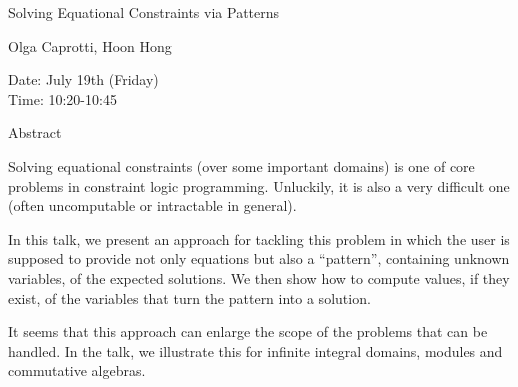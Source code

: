 \begin{center}
\LARGE
Solving Equational Constraints via Patterns

\end{center}

\begin{center}
\Large
Olga Caprotti, Hoon Hong

\end{center}

\noindent
Date:  July 19th (Friday)\\
Time:  10:20-10:45\\

\begin{center}
\large
Abstract
\end{center}

Solving equational constraints (over some important domains) is one of core problems in
constraint logic programming. Unluckily, it is also a very difficult one (often uncomputable or
intractable in general). 

In this talk, we present an approach for tackling this problem in which the user is supposed to
provide not only equations but also a ``pattern'', containing unknown variables, of the expected
solutions. We then show how to compute values, if they exist, of the variables that turn the pattern
into a solution. 

It seems that this approach can enlarge the scope of the problems that can be handled. In the talk,
we illustrate this for infinite integral domains, modules and commutative algebras. 

